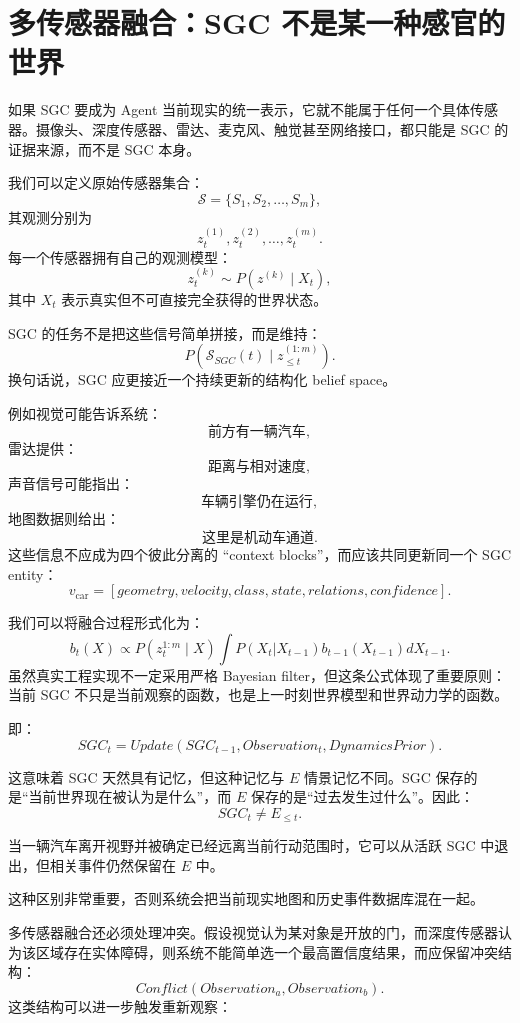 \section{多传感器融合：SGC 不是某一种感官的世界}

如果 SGC 要成为 Agent 当前现实的统一表示，它就不能属于任何一个具体传感器。摄像头、深度传感器、雷达、麦克风、触觉甚至网络接口，都只能是 SGC 的证据来源，而不是 SGC 本身。

我们可以定义原始传感器集合：
\[
\mathcal{S}
=
\{
S_1,S_2,\ldots,S_m
\},
\]
其观测分别为
\[
z_t^{(1)},z_t^{(2)},\ldots,z_t^{(m)}.
\]
每一个传感器拥有自己的观测模型：
\[
z_t^{(k)}
\sim
P
\left(
z^{(k)}
\mid
X_t
\right),
\]
其中 \(X_t\) 表示真实但不可直接完全获得的世界状态。

SGC 的任务不是把这些信号简单拼接，而是维持：
\[
P
\left(
\mathcal{S}_{SGC}(t)
\mid
z_{\leq t}^{(1:m)}
\right).
\]
换句话说，SGC 应更接近一个持续更新的结构化 belief space。

例如视觉可能告诉系统：
\[
\text{前方有一辆汽车},
\]
雷达提供：
\[
\text{距离与相对速度},
\]
声音信号可能指出：
\[
\text{车辆引擎仍在运行},
\]
地图数据则给出：
\[
\text{这里是机动车通道}.
\]
这些信息不应成为四个彼此分离的 ``context blocks''，而应该共同更新同一个 SGC entity：
\[
v_{\text{car}}
=
[
geometry,
velocity,
class,
state,
relations,
confidence
].
\]

我们可以将融合过程形式化为：
\[
b_t(X)
\propto
P(z_t^{1:m}\mid X)
\int
P(X_t|X_{t-1})
b_{t-1}(X_{t-1})
dX_{t-1}.
\]
虽然真实工程实现不一定采用严格 Bayesian filter，但这条公式体现了重要原则：当前 SGC 不只是当前观察的函数，也是上一时刻世界模型和世界动力学的函数。

即：
\[
\boxed{
SGC_t
=
Update
(
SGC_{t-1},
Observation_t,
DynamicsPrior
).
}
\]

这意味着 SGC 天然具有记忆，但这种记忆与 \(E\) 情景记忆不同。SGC 保存的是“当前世界现在被认为是什么”，而 \(E\) 保存的是“过去发生过什么”。因此：
\[
SGC_t
\neq
E_{\leq t}.
\]

当一辆汽车离开视野并被确定已经远离当前行动范围时，它可以从活跃 SGC 中退出，但相关事件仍然保留在 \(E\) 中。

这种区别非常重要，否则系统会把当前现实地图和历史事件数据库混在一起。

多传感器融合还必须处理冲突。假设视觉认为某对象是开放的门，而深度传感器认为该区域存在实体障碍，则系统不能简单选一个最高置信度结果，而应保留冲突结构：
\[
Conflict(
Observation_a,
Observation_b
).
\]
这类结构可以进一步触发重新观察：
\begin{statementbox}
\centering
{}
\end{statementbox}

